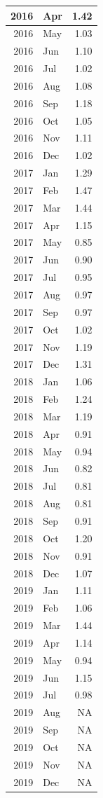 \documentclass[
]{article}
\begin{document}
\begin{table}[H]
\begin{tabular}[t]{r|l|r}
\hline
2016 & Apr & 1.42\\
\hline
2016 & May & 1.03\\
\hline
2016 & Jun & 1.10\\
\hline
2016 & Jul & 1.02\\
\hline
2016 & Aug & 1.08\\
\hline
2016 & Sep & 1.18\\
\hline
2016 & Oct & 1.05\\
\hline
2016 & Nov & 1.11\\
\hline
2016 & Dec & 1.02\\
\hline
2017 & Jan & 1.29\\
\hline
2017 & Feb & 1.47\\
\hline
2017 & Mar & 1.44\\
\hline
2017 & Apr & 1.15\\
\hline
2017 & May & 0.85\\
\hline
2017 & Jun & 0.90\\
\hline
2017 & Jul & 0.95\\
\hline
2017 & Aug & 0.97\\
\hline
2017 & Sep & 0.97\\
\hline
2017 & Oct & 1.02\\
\hline
2017 & Nov & 1.19\\
\hline
2017 & Dec & 1.31\\
\hline
2018 & Jan & 1.06\\
\hline
2018 & Feb & 1.24\\
\hline
2018 & Mar & 1.19\\
\hline
2018 & Apr & 0.91\\
\hline
2018 & May & 0.94\\
\hline
2018 & Jun & 0.82\\
\hline
2018 & Jul & 0.81\\
\hline
2018 & Aug & 0.81\\
\hline
2018 & Sep & 0.91\\
\hline
2018 & Oct & 1.20\\
\hline
2018 & Nov & 0.91\\
\hline
2018 & Dec & 1.07\\
\hline
2019 & Jan & 1.11\\
\hline
2019 & Feb & 1.06\\
\hline
2019 & Mar & 1.44\\
\hline
2019 & Apr & 1.14\\
\hline
2019 & May & 0.94\\
\hline
2019 & Jun & 1.15\\
\hline
2019 & Jul & 0.98\\
\hline
2019 & Aug & NA\\
\hline
2019 & Sep & NA\\
\hline
2019 & Oct & NA\\
\hline
2019 & Nov & NA\\
\hline
2019 & Dec & NA\\
\hline
\end{tabular}
\end{table}
\end{document}
